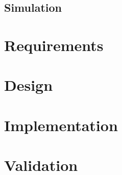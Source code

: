 \documentclass[12pt,a4paper,openright,twoside]{book}
\begin{document}
\section{Simulation}

\chapter{Requirements} 
\label{chap:requirements}


\chapter{Design} 
\label{chap:design}


\chapter{Implementation} 
\label{chap:implementation}


\chapter{Validation} %
\label{chap:validation}


\chapter{\conclusionsname}
\label{chap:conclusions}





\end{document}
